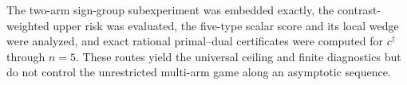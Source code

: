 The two-arm sign-group subexperiment was embedded exactly, the contrast-weighted upper risk was evaluated, the five-type scalar score and its local wedge were analyzed, and exact rational primal--dual certificates were computed for \(c^\dagger\) through \(n=5\).  These routes yield the universal ceiling and finite diagnostics but do not control the unrestricted multi-arm game along an asymptotic sequence.